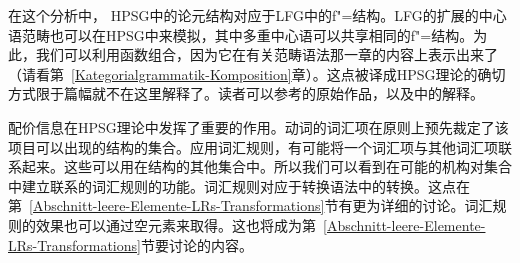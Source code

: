 在这个分析中， HPSG中的论元结构对应于LFG中的f"=结构。LFG\indexlfg 的扩展的中心语范畴也可以在HPSG中来模拟，其中多重中心语可以共享相同的f"=结构。为此，我们可以利用函数组合，因为它在有关范畴语法\indexcg 那一章的内容上表示出来了（请看第~\ref{Kategorialgrammatik-Komposition}章）。这点被译成HPSG理论的确切方式限于篇幅就不在这里解释了。读者可以参考\citet{HN94a}的原始作品，以及中的解释。

配价信息在HPSG理论中发挥了重要的作用。动词的词汇项在原则上预先裁定了该项目可以出现的结构的集合。应用词汇规则，有可能将一个词汇项与其他词汇项联系起来。这些可以用在结构的其他集合中。所以我们可以看到在可能的机构对集合中建立联系的词汇规则的功能。词汇规则对应于转换语法中的转换。这点在第~\ref{Abschnitt-leere-Elemente-LRs-Transformations}节有更为详细的讨论。词汇规则的效果也可以通过空元素来取得。这也将成为第~\ref{Abschnitt-leere-Elemente-LRs-Transformations}节要讨论的内容。


